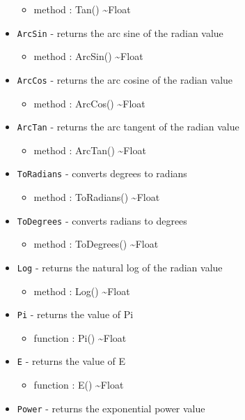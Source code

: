 \documentclass[11pt]{article}
\begin{document}
\begin{itemize}
\begin{itemize}
  \item method : Tan() \textasciitilde Float
  \end{itemize}
\item \texttt{ArcSin} - returns the arc sine of the radian value
  \begin{itemize}
  \item method : ArcSin() \textasciitilde Float
  \end{itemize}
\item \texttt{ArcCos} - returns the arc cosine of the radian value
  \begin{itemize}
  \item method : ArcCos() \textasciitilde Float
  \end{itemize}
\item \texttt{ArcTan} - returns the arc tangent of the radian value
  \begin{itemize}
  \item method : ArcTan() \textasciitilde Float
  \end{itemize}
\item \texttt{ToRadians} - converts degrees to radians
  \begin{itemize}
  \item method : ToRadians() \textasciitilde Float
  \end{itemize}
\item \texttt{ToDegrees} - converts radians to degrees
  \begin{itemize}
  \item method : ToDegrees() \textasciitilde Float
  \end{itemize}
\item \texttt{Log} - returns the natural log of the radian value
  \begin{itemize}
  \item method : Log() \textasciitilde Float
  \end{itemize}
\item \texttt{Pi} - returns the value of Pi
  \begin{itemize}
  \item function : Pi() \textasciitilde Float
  \end{itemize}
\item \texttt{E} - returns the value of E
  \begin{itemize}
  \item function : E() \textasciitilde Float
  \end{itemize}
\item \texttt{Power} - returns the exponential power value

\end{itemize}
\end{document}
